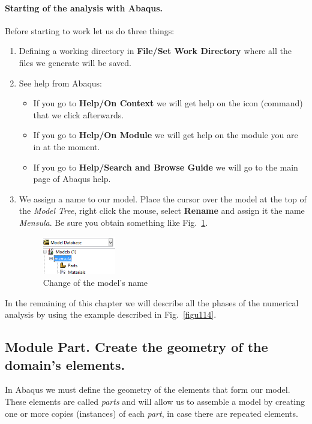 \paragraph{Starting of the analysis with Abaqus.} Before starting to work
let us do three things:
\begin{enumerate}
\item Defining a working directory in \textbf{File/Set Work Directory}
  where all the files we generate will be saved.
\item See help from Abaqus:
  \begin{itemize}
  \item If you go to \textbf{Help/On Context} we will get help on the
    icon (command) that we click afterwards.
  \item If you go to \textbf{Help/On Module} we will get help on the
    module you are in at the moment.
  \item If you go to \textbf{Help/Search and Browse Guide} we will go
    to the main page of Abaqus help.
  \end{itemize}
\item We assign a name to our model. Place the cursor over the model
  at the top of the \textit{Model Tree}, right click the mouse, select
  \textbf{Rename} and assign it the name \textit{Mensula}. Be sure you
  obtain something like Fig.~\ref{figu12}.
  \begin{figure}[!h]
    \begin{center}
      \includegraphics[width=0.3\textwidth]{./body/images/imagen12}
    \end{center}
    \caption{Change of the model's name}
    \label{figu12}
  \end{figure}
\end{enumerate}

In the remaining of this chapter we will describe all the phases of
the numerical analysis by using the example described in
Fig.~\ref{figu114}.

\newpage
\subsection{Module Part. Create the geometry of the domain's
  elements.}
In Abaqus we must define the geometry of the elements that form our
model. These elements are called \textit{parts} and will allow us to
assemble a model by creating one or more copies (instances) of each
\textit{part}, in case there are repeated elements.

